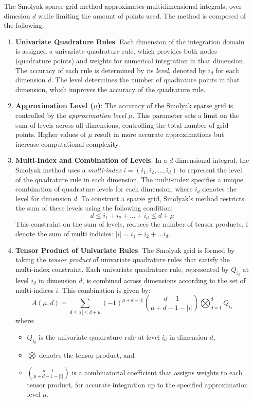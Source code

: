 \documentclass[11pt]{article}
\begin{document}
The Smolyak sparse grid method approximates multidimensional integrals, over dimesion $d$
while limiting the amount of points used. The method is composed of the following:
\begin{enumerate}
  \item \textbf{Univariate Quadrature Rules}: Each dimension of the integration domain is assigned a univariate quadrature rule, which provides both nodes (quadrature points) and weights for numerical integration in that dimension. The accuracy of each rule is determined by its \textit{level}, denoted by \( i_d \) for each dimension \( d \). The level determines the number of quadrature points in that dimension, which improves the accuracy of the quadrature rule. 
  
  \item \textbf{Approximation Level (\( \mu \))}: The accuracy of the Smolyak sparse grid is controlled by the \textit{approximation level} \( \mu \). This parameter sets a limit on the sum of levels across all dimensions, controlling the total number of grid points. Higher values of \( \mu \) result in more accurate approximations but increase computational complexity.

  \item \textbf{Multi-Index and Combination of Levels}: In a \( d \)-dimensional integral, the Smolyak method uses a \textit{multi-index} \( i= (i_1, i_2, \dots, i_d) \) to represent the level of the quadrature rule in each dimension. The multi-index specifies a unique combination of quadrature levels for each dimension, where \( i_d \) denotes the level for dimension \( d \). To construct a sparse grid, Smolyak’s method restricts the sum of these levels using the following condition:
  \[
  d \leq i_1 + i_2 + \dots + i_d \leq d +  \mu
  \]
  This constraint on the sum of levels, reduces the number of tensor products. I denote the sum of multi indicies: $\lvert i \rvert = i_1 + i_2 + \dots i_d$.

  \item \textbf{Tensor Product of Univariate Rules}: The Smolyak grid is formed by taking the \textit{tensor product} of univariate quadrature rules that satisfy the multi-index constraint. Each univariate quadrature rule, represented by \( Q_{i_d} \) at level \( i_d \) in dimension \( d \), is combined across dimensions according to the set of multi-indices \( i \). This combination is given by:
  \[
  A(\mu, d) = \sum_{d \leq |i| \leq d + \mu} (-1)^{\mu + d - |i|} \binom{d - 1}{\mu + d - 1 - |i|} \bigotimes_{d=1}^d Q_{i_d}
  \]
  where:
  \begin{itemize}
      \item \( Q_{i_d} \) is the univariate quadrature rule at level \( i_d \) in dimension \( d \),
      \item \( \bigotimes \) denotes the tensor product, and
      \item \( \binom{d - 1}{\mu + d - 1 - |i|} \) is a combinatorial coefficient that assigns weights to each tensor product, for accurate integration up to the specified approximation level \( \mu \).
  \end{itemize} 
\end{enumerate}
\end{document}
